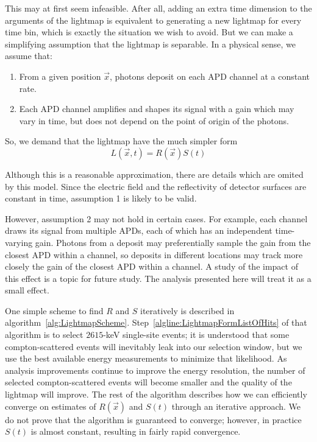 This may at first seem infeasible.  After all, adding an extra time dimension to the arguments of the lightmap is equivalent to generating a new lightmap for every time bin, which is exactly the situation we wish to avoid.  But we can make a simplifying assumption that the lightmap is separable.  In a physical sense, we assume that:
\begin{enumerate}
\item From a given position $\vec{x}$, photons deposit on each APD channel at a constant rate.
\item Each APD channel amplifies and shapes its signal with a gain which may vary in time, but does not depend on the point of origin of the photons.
\end{enumerate}
So, we demand that the lightmap have the much simpler form
\begin{equation} \label{eqn:SeparableLightmap}
L(\vec{x},t) = R(\vec{x})S(t)
\end{equation}

Although this is a reasonable approximation, there are details which are omited by this model.  Since the electric field and the reflectivity of detector surfaces are constant in time, assumption 1 is likely to be valid.

However, assumption 2 may not hold in certain cases. For example, each channel draws its signal from multiple APDs, each of which has an independent time-varying gain.  Photons from a deposit may preferentially sample the gain from the closest APD within a channel, so deposits in different locations may track more closely the gain of the closest APD within a channel.  A study of the impact of this effect is a topic for future study. The analysis presented here will treat it as a small effect.

One simple scheme to find $R$ and $S$ iteratively is described in algorithm~\ref{alg:LightmapScheme}.  Step~\ref{algline:LightmapFormListOfHits} of that algorithm is to select $2615$-keV single-site events; it is understood that some compton-scattered events will inevitably leak into our selection window, but we use the best available energy measurements to minimize that likelihood. As analysis improvements continue to improve the energy resolution, the number of selected compton-scattered events will become smaller and the quality of the lightmap will improve.  The rest of the algorithm describes how we can efficiently converge on estimates of $R(\vec{x})$ and $S(t)$ through an iterative approach.  We do not prove that the algorithm is guaranteed to converge; however, in practice $S(t)$ is almost constant, resulting in fairly rapid convergence.

